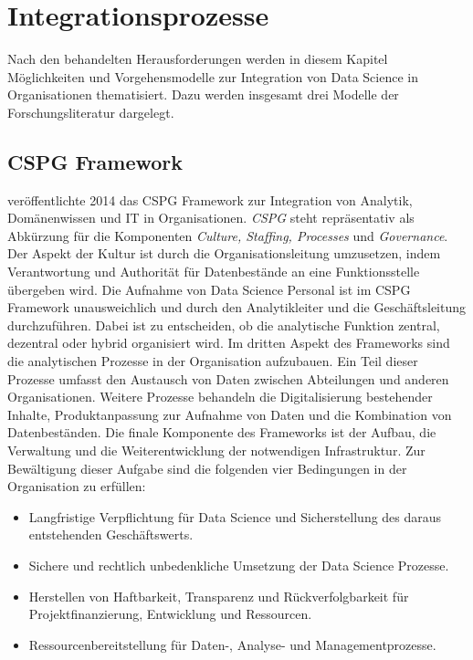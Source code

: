 \chapter[Integrationsprozesse]{Integrationsprozesse}

Nach den behandelten Herausforderungen werden in diesem Kapitel Möglichkeiten und Vorgehensmodelle zur Integration von Data Science in Organisationen thematisiert.
Dazu werden insgesamt drei Modelle der Forschungsliteratur dargelegt.

\section{CSPG Framework}

 veröffentlichte 2014 das CSPG Framework zur Integration von Analytik, Domänenwissen und IT in Organisationen.
\textit{CSPG} steht repräsentativ als Abkürzung für die Komponenten \textit{Culture, Staffing, Processes} und \textit{Governance}. 
Der Aspekt der Kultur ist durch die Organisationsleitung umzusetzen, indem Verantwortung und Authorität für Datenbestände an eine Funktionsstelle übergeben wird.
Die Aufnahme von Data Science Personal ist im CSPG Framework unausweichlich und durch den Analytikleiter und die Geschäftsleitung durchzuführen. 
Dabei ist zu entscheiden, ob die analytische Funktion zentral, dezentral oder hybrid organisiert wird.
Im dritten Aspekt des Frameworks sind die analytischen Prozesse in der Organisation aufzubauen.
Ein Teil dieser Prozesse umfasst den Austausch von Daten zwischen Abteilungen und anderen Organisationen.
Weitere Prozesse behandeln die Digitalisierung bestehender Inhalte, Produktanpassung zur Aufnahme von Daten und die Kombination von Datenbeständen.
Die finale Komponente des Frameworks ist der Aufbau, die Verwaltung und die Weiterentwicklung der notwendigen Infrastruktur.
Zur Bewältigung dieser Aufgabe sind die folgenden vier Bedingungen in der Organisation zu erfüllen:

\begin{itemize}
    \item Langfristige Verpflichtung für Data Science und Sicherstellung des daraus entstehenden Geschäftswerts.
    \item Sichere und rechtlich unbedenkliche Umsetzung der Data Science Prozesse.
    \item Herstellen von Haftbarkeit, Transparenz und Rückverfolgbarkeit für Projektfinanzierung, Entwicklung und Ressourcen.
    \item Ressourcenbereitstellung für Daten-, Analyse- und Managementprozesse.
\end{itemize}

